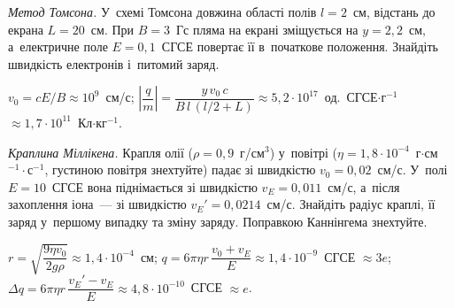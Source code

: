 \begin{problem}\label{prb:ThomsonNumbers}
	\emph{Метод Томсона.} У~схемі Томсона довжина області полів $l = 2$~см, відстань до екрана $L = 20$~см. При $B = 3$~Гс пляма на екрані зміщується на $y = 2{,}2$~см, а~електричне поле $E = 0{,}1$~СГСЕ повертає її в~початкове положення. Знайдіть швидкість електронів і~питомий заряд.
	\begin{solution}
		$v_0 = cE/B \approx 10^{9}$~см/с; $\left|\dfrac{q}{m}\right| = \dfrac{y\,v_0\,c}{B\,l\,(l/2+L)} \approx 5{,}2\cdot10^{17}$~од.~СГСЕ$\cdot$г$^{-1}$ $\approx 1{,}7\cdot10^{11}$~Кл$\cdot$кг$^{-1}$.
	\end{solution}
\end{problem}

\begin{problem}\label{prb:OilDrop}
	\emph{Краплина Міллікена.} Крапля олії ($\rho = 0{,}9$~г/см$^3$) у~повітрі ($\eta = 1{,}8\cdot10^{-4}$~г$\cdot$см$^{-1}\cdot$с$^{-1}$, густиною повітря знехтуйте) падає зі швидкістю $v_0 = 0{,}02$~см/с. У~полі $E = 10$~СГСЕ вона піднімається зі швидкістю $v_E = 0{,}011$~см/с, а~після захоплення іона~--- зі швидкістю $v_E' = 0{,}0214$~см/с. Знайдіть радіус краплі, її заряд у~першому випадку та зміну заряду. Поправкою Каннінгема знехтуйте.
	\begin{solution}
		$r = \sqrt{\dfrac{9\eta v_0}{2g\rho}} \approx 1{,}4\cdot10^{-4}$~см; $q = 6\pi\eta r\,\dfrac{v_0+v_E}{E} \approx 1{,}4\cdot10^{-9}$~СГСЕ $\approx 3e$; $\Delta q = 6\pi\eta r\,\dfrac{v_E'-v_E}{E} \approx 4{,}8\cdot10^{-10}$~СГСЕ $\approx e$.
	\end{solution}
\end{problem}

